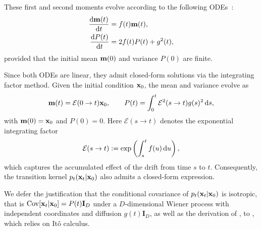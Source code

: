 These first and second moments evolve according to the following ODEs~\citep{sarkka2019applied}:
\begin{align}\label{eq:mean-var-evolution}
\begin{aligned}
    \frac{\mathop{}\!\mathrm{d} {\mathbf{m}}(t)}{\mathop{}\!\mathrm{d} t} &= f(t) {\mathbf{m}}(t), \\
    \frac{\mathop{}\!\mathrm{d} P(t)}{\mathop{}\!\mathrm{d} t} &= 2f(t) P(t) + g^2(t),
\end{aligned}
\end{align}
provided that the initial mean ${\mathbf{m}}(0)$ and variance $P(0)$ are finite.

Since both ODEs are linear, they admit closed-form solutions via the integrating factor method. 
Given the initial condition ${\mathbf{x}}_0$, the mean and variance evolve as
\begin{align}\label{eq:mean-var-solution}
    {\mathbf{m}}(t) = \mathcal{E}(0  \to  t) {\mathbf{x}}_0, 
\qquad 
P(t) = \int_{0}^{t} \mathcal{E}^{2}(s  \to  t)  g(s)^{2} \mathop{}\!\mathrm{d} s,
\end{align}
with ${\mathbf{m}}(0)={\mathbf{x}}_0$ and $P(0)=0$. 
Here $\mathcal{E}(s  \to  t)$ denotes the exponential integrating factor
\[
\mathcal{E}(s  \to  t) := \exp \left(\int_{s}^{t} f(u) \mathop{}\!\mathrm{d} u\right),
\]
which captures the accumulated effect of the drift from time $s$ to $t$. Consequently, the transition kernel $p_t({\mathbf{x}}_t | {\mathbf{x}}_0)$ also admits a closed-form expression. 

We defer the justification that the conditional covariance of $p_t({\mathbf{x}}_t |{\mathbf{x}}_0)$ is isotropic, that is 
$\operatorname{Cov}[{\mathbf{x}}_t | {\mathbf{x}}_0] = P(t) \mathbf I_D$ under a $D$-dimensional Wiener process with independent coordinates and diffusion $g(t)\mathbf I_D$, as well as the derivation of , to , which relies on Itô calculus.



